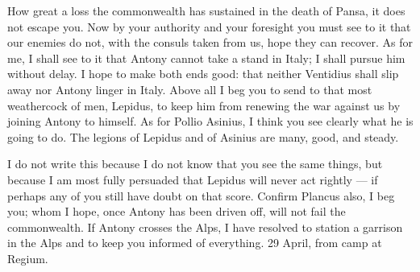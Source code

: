 

 How great a loss the commonwealth has sustained in the death of Pansa, it does not escape you. Now by your authority and your foresight you must see to it that our enemies do not, with the consuls taken from us, hope they can recover. As for me, I shall see to it that Antony cannot take a stand in Italy; I shall pursue him without delay. I hope to make both ends good: that neither Ventidius shall slip away nor Antony linger in Italy. Above all I beg you to send to that most weathercock of men, Lepidus, to keep him from renewing the war against us by joining Antony to himself. As for Pollio Asinius, I think you see clearly what he is going to do. The legions of Lepidus and of Asinius are many, good, and steady.

 I do not write this because I do not know that you see the same things, but because I am most fully persuaded that Lepidus will never act rightly --- if perhaps any of you still have doubt on that score. Confirm Plancus also, I beg you; whom I hope, once Antony has been driven off, will not fail the commonwealth. If Antony crosses the Alps, I have resolved to station a garrison in the Alps and to keep you informed of everything. 29 April, from camp at Regium.
